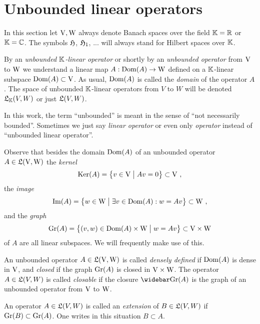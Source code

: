 %
\section{Unbounded linear operators}
\label{sec:unbounded-linear-operators}
%
\para 
In this section let $\mathrm{V},\mathrm{W}$ always denote Banach spaces over the field 
$\mathbb{K} =\mathbb{R}$ or $\mathbb{K}=\mathbb{C}$. The symbols $\mathfrak{H}$, $\mathfrak{H}_1$, ... will always stand for Hilbert spaces over $\mathbb{K}$. 

\begin{definition} 
  By an \emph{unbounded $\mathbb{K}$-linear operator} or shortly by an 
  \emph{unbounded operator} from $\mathrm{V}$ to $\mathrm{W}$ we understand a linear map 
  $A: \operatorname{Dom} (A) \to \mathrm{W}$ defined on a $\mathbb{K}$-linear subspace $\operatorname{Dom} (A)\subset \mathrm{V}$.
  As usual, $\operatorname{Dom} (A)$ is called the \emph{domain} of the operator $A$.
  The space of unbounded $\mathbb{K}$-linear operators from $V$ to $W$ will be 
  denoted $\mathfrak{L}_{\mathbb{K}} (V,W)$ or just  $\mathfrak{L} (V,W)$.
\end{definition}

\begin{remark}
  In this work, the term ``unbounded'' is meant in the sense of
  ``not necessarily bounded''. Sometimes we just say 
  \emph{linear operator} or even only \emph{operator} instead of
  ``unbounded linear operator''.
\end{remark}

\para Observe that besides the domain $\operatorname{Dom} (A)$ of an unbounded operator 
  $A \in \mathfrak{L} (\mathrm{V},\mathrm{W})$ the 
  \emph{kernel} 
  \[\operatorname{Ker}(A)=\big\{ v \in \mathrm{V} \bigm\vert Av = 0 \big\}\subset\mathrm{V} \ , \]
  the \emph{image} 
  \[\operatorname{Im}(A)=\big\{ w \in \mathrm{W} \bigm\vert \exists v\in \operatorname{Dom} (A): w = Av \big\}
  \subset \mathrm{W} \ , \] 
  and the \emph{graph}
  \[\operatorname{Gr}(A)=\big\{ (v,w) \in \operatorname{Dom} (A) \times \mathrm{W} \bigm\vert 
    w = Av \big\} \subset \mathrm{V} \times \mathrm{W} \]
  of $A$  are all linear subspaces. We will frequently make use of this.
  
\begin{definition}
  An unbounded operator $A\in \mathfrak{L} (\mathrm{V},\mathrm{W})$ is called 
  \emph{densely defined} if $\operatorname{Dom} (A)$ is dense in $\mathrm{V}$,
  and \emph{closed} if the graph $\operatorname{Gr} (A)$ 
  is closed in $\mathrm{V} \times \mathrm{W}$.
  The operator $A \in \mathfrak{L} (V,W)$ is called \emph{closable} if the closure
  $\closure{\Gr(A)}$ is the graph of an unbounded operator 
  from $\mathrm{V}$ to $\mathrm{W}$. 

  An operator $A \in \mathfrak{L} (V,W)$ is called an \emph{extension} of 
  $B \in \mathfrak{L} (V,W)$ if $\operatorname{Gr} (B) \subset \operatorname{Gr} (A)$. One writes in this
  situation $B \subset A$. 
\end{definition}

  
   
